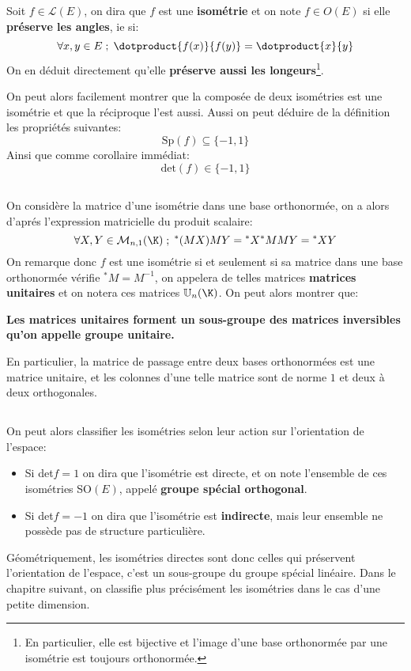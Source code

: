 \subsection*{}
Soit \(f \in \mathcal{L}(E)\), on dira que \(f\) est une \textbf{isométrie} et on note \(f \in O(E)\) si elle \textbf{préserve les angles}, ie si:
\[
   \forall x, y \in E \; ; \; \dotproduct{f(x)}{f(y)} = \dotproduct{x}{y}   
\]
On en déduit directement qu'elle \textbf{préserve aussi les longeurs}\footnote[1]{En particulier, elle est bijective et l'image d'une base orthonormée par une isométrie est toujours orthonormée.}.\<

On peut alors facilement montrer que la composée de deux isométries est une isométrie et que la réciproque l'est aussi. Aussi on peut déduire de la définition les propriétés suivantes:
\[
   \text{Sp}(f) \subseteq \{-1, 1\}   
\]
Ainsi que comme corollaire immédiat:
\[
   \text{det}(f) \in \{-1, 1\}
\]
\subsection*{}
On considère la matrice d'une isométrie dans une base orthonormée, on a alors d'aprés l'expression matricielle du produit scalaire:
\[
   \forall X, Y \in \mathcal{M}_{n, 1}(\K) \; ; \; {}^*(MX)MY = {}^*X{}^*MMY = {}^*XY  
\]
On remarque donc \(f\) est une isométrie si et seulement si sa matrice dans une base orthonormée vérifie \({}^*M = M^{-1}\), on appelera de telles matrices \textbf{matrices unitaires} et on notera ces matrices \(\mathbb{U}_n(\K)\). On peut alors montrer que:
\begin{center}
   \textbf{Les matrices unitaires forment un sous-groupe des matrices inversibles qu'on appelle groupe unitaire.}
\end{center}
En particulier, la matrice de passage entre deux bases orthonormées est une matrice unitaire, et les colonnes d'une telle matrice sont de norme \(1\) et deux à deux orthogonales.
\subsection*{}
On peut alors classifier les isométries selon leur action sur l'orientation de l'espace:
\begin{itemize}
   \item Si det\(f = 1\) on dira que l'isométrie est directe, et on note l'ensemble de ces isométries SO\((E)\), appelé \textbf{groupe spécial orthogonal}.
   \item Si det\(f = -1\) on dira que l'isométrie est \textbf{indirecte}, mais leur ensemble ne possède pas de structure particulière.
\end{itemize}
Géométriquement, les isométries directes sont donc celles qui préservent l'orientation de l'espace, c'est un sous-groupe du groupe spécial linéaire. Dans le chapitre suivant, on classifie plus précisément les isométries dans le cas d'une petite dimension.
\pagebreak
